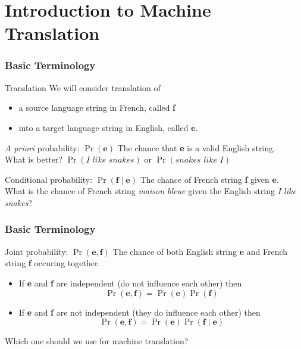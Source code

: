 





\section{Introduction to Machine Translation}
\frame{\tableofcontents[currentsection]}

\begin{frame}
\frametitle{Basic Terminology}
\begin{block}{Translation}
We will consider translation of 
\begin{itemize}
\item a source language string in French, called \textbf{f} 
\item into a target language string in English, called \textbf{e}.
\end{itemize}
\end{block}\pause
\begin{block}{\textit{A priori} probability: $\Pr(\textbf{e})$}
The chance that \textbf{e} is a valid English string.\\
What is better? $\Pr(\textit{I like snakes})$ or $\Pr(\textit{snakes like I})$
\end{block}\pause
\begin{block}{Conditional probability: $\Pr(\textbf{f} \mid \textbf{e})$}
The chance of French string \textbf{f} given \textbf{e}. \\
What is the chance of French string \textit{maison bleue} given the English string \textit{I like snakes}?
\end{block}
\end{frame}

\begin{frame}
\frametitle{Basic Terminology}
\begin{block}{Joint probability: $\Pr(\textbf{e}, \textbf{f})$}
The chance of both English string \textbf{e} and French string \textbf{f} occuring together.
\begin{itemize}[<+->]
\item If \textbf{e} and \textbf{f} are independent (do not influence each other) then 
\[ \Pr(\textbf{e}, \textbf{f}) = \Pr(\textbf{e}) \Pr(\textbf{f}) \]
\item If \textbf{e} and \textbf{f} are not independent (they do influence each other) then
\[ \Pr(\textbf{e}, \textbf{f}) = \Pr(\textbf{e}) \Pr(\textbf{f} \mid \textbf{e}) \]
\end{itemize}\pause
Which one should we use for machine translation?
\end{block}
\end{frame}

